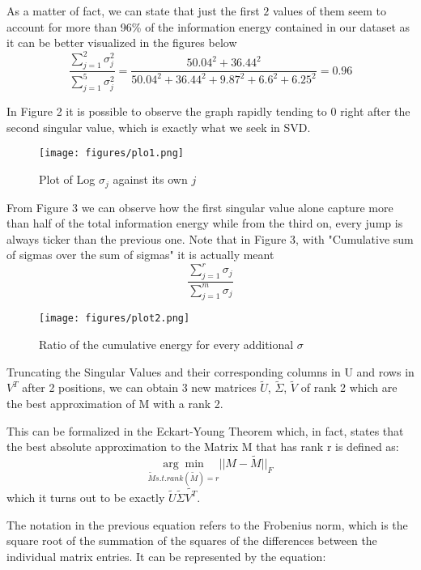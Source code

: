 \documentclass[10pt]{article}
\theoremstyle{plain}
\theoremstyle{definition}
\begin{document}
As a matter of fact, we can state that just the first $2$ values of them seem to account for more than 96\% of the information energy contained in our dataset as it can be better visualized in the figures below
\begin{equation}
\frac{\sum_{j=1}^2{\sigma_j^2}}{\sum_{j=1}^5{\sigma_j^2}} = \frac{50.04^2 + 36.44^2}{50.04^2 + 36.44^2 + 9.87^2 + 6.6^2 + 6.25^2}  = 0.96
\end{equation}

In Figure 2 it is possible to observe the graph rapidly tending to $0$ right after the second singular value, which is exactly what we seek in SVD.
\begin{figure}[H]
    \centering
    \texttt{[image: figures/plo1.png]}
    \caption{Plot of Log $\sigma_j$ against its own $j$}
    \label{fig:my_label2}
\end{figure}
From Figure 3 we can observe how the first singular value alone capture more than half of the total information energy while from the third on, every jump is always ticker than the previous one.
Note that in Figure $3$, with "Cumulative sum of sigmas over the sum of sigmas" it is actually meant \begin{equation}
\frac{\sum_{j=1}^r{\sigma_j}}{\sum_{j=1}^m{\sigma_j}}
\end{equation}
\begin{figure}[H]
    \centering
    \texttt{[image: figures/plot2.png]}
    \caption{Ratio of the cumulative energy for every additional $\sigma$}
    \label{fig:my_label3}
\end{figure}

Truncating the Singular Values and their corresponding columns in U and rows in $V^T$  after 2 positions, we can obtain 3 new matrices $\tilde{U}$, $\tilde{\Sigma}$, $\tilde{V}$ of rank 2 which are the best approximation of M with a rank 2.

This can be formalized in the Eckart-Young Theorem which, in fact, states that the best absolute approximation to the Matrix M that has rank r is defined as:
\begin{equation}
    \underset{\tilde{M} s.t. rank(\tilde{M})=r}{\arg\min} ||M - \tilde{M}||_F   
\end{equation}
which it turns out to be exactly $\tilde{U}$$\tilde{\Sigma}$$\tilde{V^T}$.

The notation in the previous equation refers to the Frobenius norm, which is the square root of the summation of the squares of the differences between the individual matrix entries. It can be represented by the equation:
\end{document}
